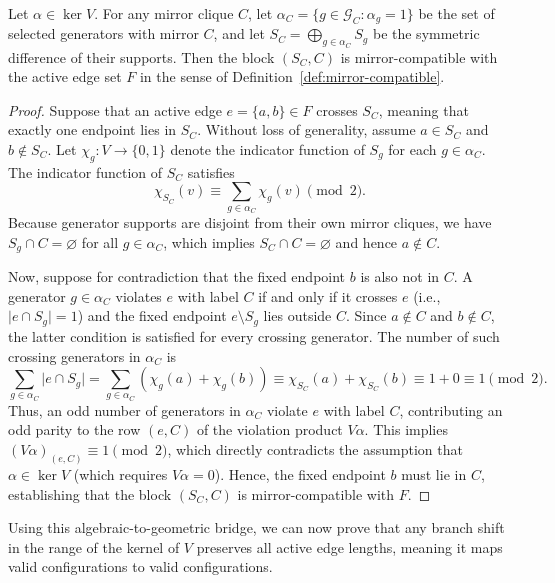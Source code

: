 \begin{lemma}
\label{lem:kernel-compatibility}
Let $\alpha \in \ker V$. For any mirror clique $C$, let $\alpha_C = \{g \in \mathcal{G}_C : \alpha_g = 1\}$ be the set of selected generators with mirror $C$, and let $S_C = \bigoplus_{g \in \alpha_C} S_g$ be the symmetric difference of their supports. Then the block $(S_C, C)$ is mirror-compatible with the active edge set $F$ in the sense of Definition~\ref{def:mirror-compatible}.
\end{lemma}

\begin{proof}
Suppose that an active edge $e = \{a,b\} \in F$ crosses $S_C$, meaning that exactly one endpoint lies in $S_C$. Without loss of generality, assume $a \in S_C$ and $b \notin S_C$. Let $\chi_g: V \to \{0,1\}$ denote the indicator function of $S_g$ for each $g \in \alpha_C$. The indicator function of $S_C$ satisfies
\[
\chi_{S_C}(v) \equiv \sum_{g \in \alpha_C} \chi_g(v) \pmod 2.
\]
Because generator supports are disjoint from their own mirror cliques, we have $S_g \cap C = \varnothing$ for all $g \in \alpha_C$, which implies $S_C \cap C = \varnothing$ and hence $a \notin C$.

Now, suppose for contradiction that the fixed endpoint $b$ is also not in $C$. A generator $g \in \alpha_C$ violates $e$ with label $C$ if and only if it crosses $e$ (i.e., $\lvert e \cap S_g \rvert = 1$) and the fixed endpoint $e \setminus S_g$ lies outside $C$. Since $a \notin C$ and $b \notin C$, the latter condition is satisfied for every crossing generator. The number of such crossing generators in $\alpha_C$ is
\[
\sum_{g \in \alpha_C} \lvert e \cap S_g \rvert
=
\sum_{g \in \alpha_C} (\chi_g(a) + \chi_g(b))
\equiv
\chi_{S_C}(a) + \chi_{S_C}(b)
\equiv
1 + 0
\equiv
1 \pmod 2.
\]
Thus, an odd number of generators in $\alpha_C$ violate $e$ with label $C$, contributing an odd parity to the row $(e,C)$ of the violation product $V\alpha$. This implies $(V\alpha)_{(e,C)} \equiv 1 \pmod 2$, which directly contradicts the assumption that $\alpha \in \ker V$ (which requires $V\alpha = 0$). Hence, the fixed endpoint $b$ must lie in $C$, establishing that the block $(S_C, C)$ is mirror-compatible with $F$.
\end{proof}

Using this algebraic-to-geometric bridge, we can now prove that any branch shift in the range of the kernel of $V$ preserves all active edge lengths, meaning it maps valid configurations to valid configurations.

